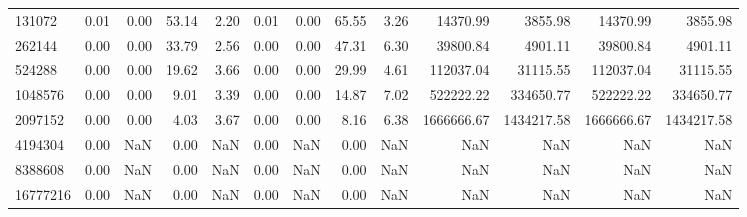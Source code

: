 \begin{tabular}{lrrrrrrrrrrrr}
131072 & 0.01 & 0.00 & 53.14 & 2.20 & 0.01 & 0.00 & 65.55 & 3.26 & 14370.99 & 3855.98 & 14370.99 & 3855.98 \\
262144 & 0.00 & 0.00 & 33.79 & 2.56 & 0.00 & 0.00 & 47.31 & 6.30 & 39800.84 & 4901.11 & 39800.84 & 4901.11 \\
524288 & 0.00 & 0.00 & 19.62 & 3.66 & 0.00 & 0.00 & 29.99 & 4.61 & 112037.04 & 31115.55 & 112037.04 & 31115.55 \\
1048576 & 0.00 & 0.00 & 9.01 & 3.39 & 0.00 & 0.00 & 14.87 & 7.02 & 522222.22 & 334650.77 & 522222.22 & 334650.77 \\
2097152 & 0.00 & 0.00 & 4.03 & 3.67 & 0.00 & 0.00 & 8.16 & 6.38 & 1666666.67 & 1434217.58 & 1666666.67 & 1434217.58 \\
4194304 & 0.00 & NaN & 0.00 & NaN & 0.00 & NaN & 0.00 & NaN & NaN & NaN & NaN & NaN \\
8388608 & 0.00 & NaN & 0.00 & NaN & 0.00 & NaN & 0.00 & NaN & NaN & NaN & NaN & NaN \\
16777216 & 0.00 & NaN & 0.00 & NaN & 0.00 & NaN & 0.00 & NaN & NaN & NaN & NaN & NaN \\
\bottomrule
\end{tabular}
